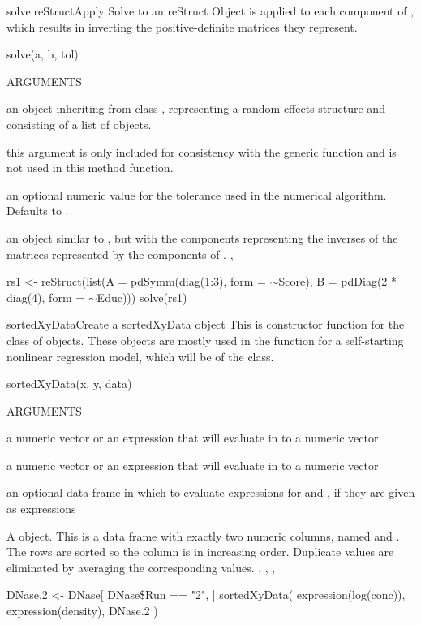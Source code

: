 \documentclass[pdftex]{article} \usepackage{url,graphicx}
\renewcommand{\Twiddle}{\mbox{\(\sim\)}}
\begin{document}
\begin{Helpfile}{solve.reStruct}{Apply Solve to an reStruct Object}
 is applied to each  component of ,
which results in inverting the positive-definite matrices they
represent.
\begin{Example}
solve(a, b, tol)
\end{Example}
\begin{Argument}{ARGUMENTS}
\item[\Co{a:}]
an object inheriting from class ,
representing a random effects structure and consisting of a list of
 objects.
\item[\Co{b:}]
this argument is only included for consistency with the
generic function and is not used in this method function.
\item[\Co{tol:}]
an optional numeric value for the tolerance used in the
numerical algorithm. Defaults to .
\end{Argument}
an  object similar to , but with the
 components representing the inverses of the
matrices represented by the components of .
, 
\need 15pt
\vspace{-16pt} 
\begin{Example}
rs1 <- reStruct(list(A = pdSymm(diag(1:3), form = \Twiddle Score),
  B = pdDiag(2 * diag(4), form = \Twiddle Educ)))
solve(rs1)
\end{Example}
\end{Helpfile}
\begin{Helpfile}{sortedXyData}{Create a sortedXyData object}
This is constructor function for the class of 
objects.  These objects are mostly used in the 
function for a self-starting nonlinear regression model, which will be
of the  class.
\begin{Example}
sortedXyData(x, y, data)
\end{Example}
\begin{Argument}{ARGUMENTS}
\item[\Co{x:}]
a numeric vector or an expression that will evaluate in
 to a numeric vector 
\item[\Co{y:}]
a numeric vector or an expression that will evaluate in
 to a numeric vector 
\item[\Co{data:}]
an optional data frame in which to evaluate expressions
for  and , if they are given as expressions 
\end{Argument}
A  object. This is a data frame with exactly
two numeric columns, named  and .  The rows are
sorted so the  column is in increasing order.  Duplicate
 values are eliminated by averaging the corresponding 
values.
, ,
, 
\need 15pt
\vspace{-16pt}
\begin{Example}
DNase.2 <- DNase[ DNase\$Run == "2", ]
sortedXyData( expression(log(conc)), expression(density), DNase.2 )
\end{Example}
\end{Helpfile}
\end{document}
